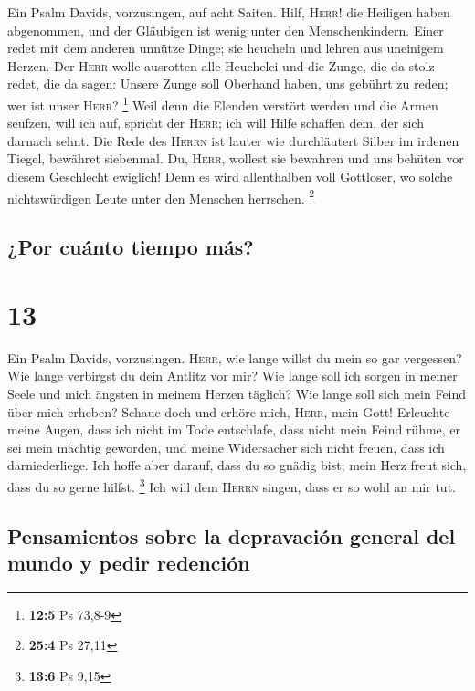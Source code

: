  Ein Psalm Davids, vorzusingen, auf acht Saiten.
 Hilf, \textsc{Herr}! die Heiligen haben abgenommen, und
der Gläubigen ist wenig unter den Menschenkindern.  Einer
redet mit dem anderen unnütze Dinge; sie heucheln und lehren aus
uneinigem Herzen.  Der \textsc{Herr} wolle ausrotten alle
Heuchelei und die Zunge, die da stolz redet,  die da
sagen: Unsere Zunge soll Oberhand haben, uns gebührt zu reden; wer ist
unser \textsc{Herr}? \footnote{\textbf{12:5} Ps 73,8-9} 
Weil denn die Elenden verstört werden und die Armen seufzen, will ich
auf, spricht der \textsc{Herr}; ich will Hilfe schaffen dem, der sich
darnach sehnt.  Die Rede des \textsc{Herrn} ist lauter wie
durchläutert Silber im irdenen Tiegel, bewähret siebenmal.
 Du, \textsc{Herr}, wollest sie bewahren und uns behüten
vor diesem Geschlecht ewiglich!  Denn es wird allenthalben
voll Gottloser, wo solche nichtswürdigen Leute unter den Menschen
herrschen. \footnote{\textbf{25:4} Ps 27,11}

\hypertarget{por-cuuxe1nto-tiempo-muxe1s}{%
\subsection{¿Por cuánto tiempo más?}\label{por-cuuxe1nto-tiempo-muxe1s}}

\hypertarget{section-12}{%
\section{13}\label{section-12}}

 Ein Psalm Davids, vorzusingen. 
\textsc{Herr}, wie lange willst du mein so gar vergessen? Wie lange
verbirgst du dein Antlitz vor mir?  Wie lange soll ich
sorgen in meiner Seele und mich ängsten in meinem Herzen täglich? Wie
lange soll sich mein Feind über mich erheben?  Schaue doch
und erhöre mich, \textsc{Herr}, mein Gott! Erleuchte meine Augen, dass
ich nicht im Tode entschlafe,  dass nicht mein Feind
rühme, er sei mein mächtig geworden, und meine Widersacher sich nicht
freuen, dass ich darniederliege.  Ich hoffe aber darauf,
dass du so gnädig bist; mein Herz freut sich, dass du so gerne hilfst.
\footnote{\textbf{13:6} Ps 9,15}  Ich will dem
\textsc{Herrn} singen, dass er so wohl an mir tut.

\hypertarget{pensamientos-sobre-la-depravaciuxf3n-general-del-mundo-y-pedir-redenciuxf3n}{%
\subsection{Pensamientos sobre la depravación general del mundo y pedir
redención}\label{pensamientos-sobre-la-depravaciuxf3n-general-del-mundo-y-pedir-redenciuxf3n}}

